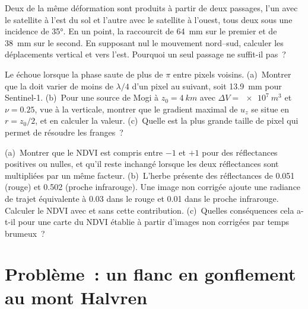 \begin{exercise}[$\star\star\star$]\label{exo:b3:remote-sensing-gis:10}
Deux  de la même déformation sont produits à partir de deux passages, l'un
avec le satellite à l'est du sol et l'autre avec le satellite à l'ouest,
tous deux sous une incidence de \ang{35}. En un point, la
 raccourcit de \qty{64}{mm} sur le premier et de \qty{38}{mm} sur
le second. En supposant nul le mouvement nord--sud, calculer les déplacements vertical et
vers l'est. Pourquoi un seul passage ne suffit-il pas~?
\end{exercise}

\begin{exercise}[$\star\star\star$]\label{exo:b3:remote-sensing-gis:11}
Le  échoue lorsque la phase saute de plus de $\pi$ entre
pixels voisins. (a)~Montrer que la  doit varier de moins de
$\lambda/4$ d'un pixel au suivant, soit \qty{13.9}{mm} pour
Sentinel-1. (b)~Pour une source de Mogi à $z_0 = \qty{4}{km}$ avec $\Delta V =
\qty{e7}{m^3}$ et $\nu = 0.25$, vue à la verticale, montrer que le gradient maximal
de $u_z$ se situe en $r = z_0/2$, et en calculer la valeur. (c)~Quelle est la
plus grande taille de pixel qui permet de résoudre les franges~?
\end{exercise}

\begin{exercise}[$\star\star\star$]\label{exo:b3:remote-sensing-gis:12}
(a)~Montrer que le NDVI est compris entre $-1$ et $+1$ pour des réflectances
positives ou nulles, et qu'il reste inchangé lorsque les deux réflectances sont
multipliées par un même facteur. (b)~L'herbe présente des réflectances de 0.051 (rouge)
et 0.502 (proche infrarouge). Une image non corrigée ajoute une radiance de trajet
équivalente à 0.03 dans le rouge et 0.01 dans le proche infrarouge. Calculer le
NDVI avec et sans cette contribution. (c)~Quelles conséquences cela a-t-il pour une carte du NDVI
établie à partir d'images non corrigées par temps brumeux~?
\end{exercise}

\section{Problème~: un flanc en gonflement au mont Halvren}

